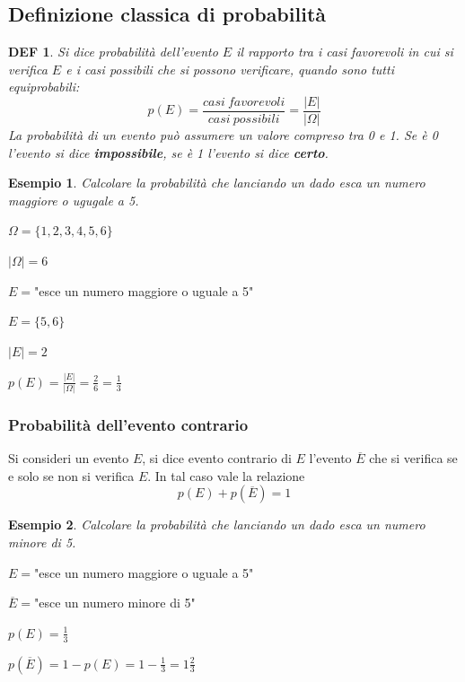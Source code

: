 \documentclass{article}     %
\newtheorem*{definition}{DEF}
\newtheorem{ex}{Esempio}[section]
\begin{document}
        \subsection{Definizione classica di probabilità}
        \begin{definition}
            Si dice probabilità dell'evento $E$ il rapporto tra i casi favorevoli in cui si verifica $E$ e i casi possibili che si possono verificare, quando sono tutti equiprobabili:
        \[p(E)=\frac{casi~favorevoli}{casi~possibili}=\frac{|E|}{|\Omega|}\]
        La probabilità di un evento può assumere un valore compreso tra 0 e 1. Se è 0 l'evento si dice \textbf{impossibile}, se è 1 l'evento si dice \textbf{certo}. 
        \end{definition}
        \begin{ex}
            Calcolare la probabilità che lanciando un dado esca un numero maggiore o ugugale a 5.
            
        \end{ex}

        $\Omega=\{1,2,3,4,5,6\}$

        $|\Omega|=6$

        $E=$"esce un numero maggiore o uguale a 5"

        $E=\{5,6\}$

        $|E|=2$

        $p(E)=\frac{|E|}{|\Omega|}=\frac{2}{6}=\frac{1}{3}$

        \subsubsection{Probabilità dell'evento contrario}
            Si consideri un evento $E$, si dice evento contrario di $E$ l'evento $\overline{E}$ che si verifica se e solo se non si verifica $E$.
            In tal caso vale la relazione \[p(E)+p(\overline{E})=1\]
            \begin{ex}
                Calcolare la probabilità che lanciando un dado esca un numero minore di 5.
                
            \end{ex}
            
            $E=$"esce un numero maggiore o uguale a 5"

            $\overline{E}=$"esce un numero minore di 5"

            $p(E)=\frac{1}{3}$

            $p(\overline{E})=1-p(E)=1-\frac{1}{3}=1\frac{2}{3}$
\end{document}
